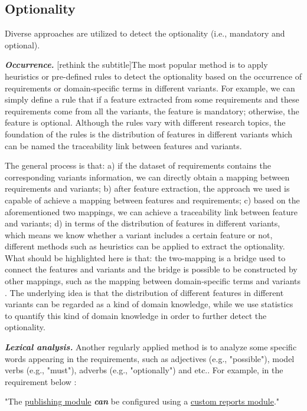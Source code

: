 \documentclass[graybox]{svmult}
\newcommand{\todo}[1]{{\color{red} [#1]}}
\begin{document}
\subsection{Optionality}
Diverse approaches are utilized to detect the optionality (i.e., mandatory and optional).

\textit{\textbf{Occurrence.}} \todo{rethink the subtitle}The most popular method is to apply heuristics or pre-defined rules to detect the optionality based on the occurrence of requirements or domain-specific terms in different variants. 
For example, we can simply define a rule that if a feature extracted from some requirements and these requirements come from all the variants, the feature is mandatory; otherwise, the feature is optional. Although the rules vary with different research topics, the foundation of the rules is the distribution of features in different variants which can be named the traceability link between features and variants.

The general process is that: a) if the dataset of requirements contains the corresponding variants information, we can directly obtain a mapping between requirements and variants; b) after feature extraction, the approach we used is capable of achieve a mapping between features and requirements; c) based on the aforementioned two mappings, we can achieve a traceability link between feature and variants; d) in terms of the distribution of features in different variants, which means we know whether a variant includes a certain feature or not, different methods such as heuristics can be applied to extract the optionality. What should be highlighted here is that: the two-mapping is a bridge used to connect the features and variants and the bridge is possible to be constructed by other mappings, such as the mapping between domain-specific terms and variants \cite{FerrariSD13}. 
The underlying idea is that the distribution of different features in different variants can be regarded as a kind of domain knowledge, while we use statistics to quantify this kind of domain knowledge in order to further detect the optionality.


\textit{\textbf{Lexical analysis.}} Another regularly applied method is to analyze some specific words appearing in the requirements, such as adjectives (e.g., "possible"), model verbs (e.g., "must"), adverbs (e.g., "optionally") and etc.. 
For example, in the requirement below \cite{Sree-KumarPC18}:
\begin{shaded}
"The \underline{publishing module} \textit{\textbf{can}} be configured using a \underline{custom reports module}." 
\end{shaded}
\end{document}

